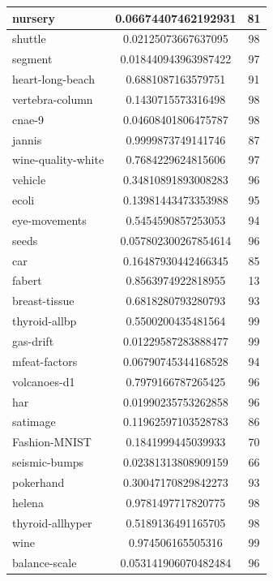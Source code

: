 \documentclass[times,specification,annotation]{itmo-student-thesis}
\begin{document}
\begin{center}
\begin{longtable}{ |m{5cm}|c|c| }
			\hline
			nursery & 0.06674407462192931 & 81 \\
			\hline
			shuttle & 0.02125073667637095 & 98 \\
			\hline
			segment & 0.018440943963987422 & 97 \\
			\hline
			heart-long-beach & 0.6881087163579751 & 91 \\
			\hline
			vertebra-column & 0.1430715573316498 & 98 \\
			\hline
			cnae-9 & 0.04608401806475787 & 98 \\
			\hline
			jannis & 0.9999873749141746 & 87 \\
			\hline
			wine-quality-white & 0.7684229624815606 & 97 \\
			\hline
			vehicle & 0.34810891893008283 & 96 \\
			\hline
			ecoli & 0.13981443473353988 & 95 \\
			\hline
			eye-movements & 0.5454590857253053 & 94 \\
			\hline
			seeds & 0.057802300267854614 & 96 \\
			\hline
			car & 0.16487930442466345 & 85 \\
			\hline
			fabert & 0.8563974922818955 & 13 \\
			\hline
			breast-tissue & 0.6818280793280793 & 93 \\
			\hline
			thyroid-allbp & 0.5500200435481564 & 99 \\
			\hline
			gas-drift & 0.01229587283888477 & 99 \\
			\hline
			mfeat-factors & 0.06790745344168528 & 94 \\
			\hline
			volcanoes-d1 & 0.7979166787265425 & 96 \\
			\hline
			har & 0.01990235753262858 & 96 \\
			\hline
			satimage & 0.11962597103528783 & 86 \\
			\hline
			Fashion-MNIST & 0.1841999445039933 & 70 \\
			\hline
			seismic-bumps & 0.02381313808909159 & 66 \\
			\hline
			pokerhand & 0.30047170829842273 & 93 \\
			\hline
			helena & 0.9781497717820775 & 98 \\
			\hline
			thyroid-allhyper & 0.5189136491165705 & 98 \\
			\hline
			wine & 0.974506165505316 & 99 \\
			\hline
			balance-scale & 0.053141906070482484 & 96 \\

\end{longtable}
\end{center}
\end{document}
